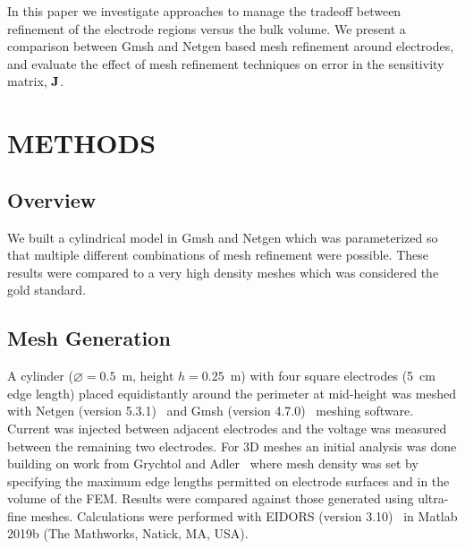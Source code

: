 \documentclass[12pt]{iopart}
\begin{document}
In this paper we investigate approaches to manage the tradeoff
between refinement of the electrode regions versus the bulk volume. 
We present a comparison between Gmsh and 
Netgen based mesh refinement around electrodes, and evaluate the 
effect of mesh refinement techniques on error in  the sensitivity matrix, 
$\bf J$. 

\section{METHODS}
\subsection{Overview}

We built a cylindrical model in Gmsh and Netgen which was parameterized so that multiple
different combinations of mesh refinement were possible.
These results were compared to a very high density meshes which was considered the gold standard.

\subsection{Mesh Generation}
A cylinder ($\diameter=0.5$~m, height $h=0.25$~m) with four square electrodes 
(5~cm edge length) placed equidistantly around the perimeter at mid-height was
meshed with Netgen (version 5.3.1)~\parencite{schoberl_netgen_1997} and Gmsh 
(version 4.7.0)~\parencite{geuzaine_gmsh_2009}
meshing software.
Current was injected between adjacent electrodes and the voltage was measured between the remaining
two electrodes.
For 3D meshes an initial analysis was done building on work from 
Grychtol and Adler~\parencite{grychtol_fem_2013} where mesh density was
set by specifying the maximum edge lengths permitted on electrode surfaces
and in the volume of the FEM.
Results were compared against those generated using ultra-fine meshes. 
Calculations were performed with EIDORS (version 3.10)~\parencite{adler_uses_2006} 
in Matlab 2019b
(The Mathworks, Natick, MA, USA).
\end{document}

